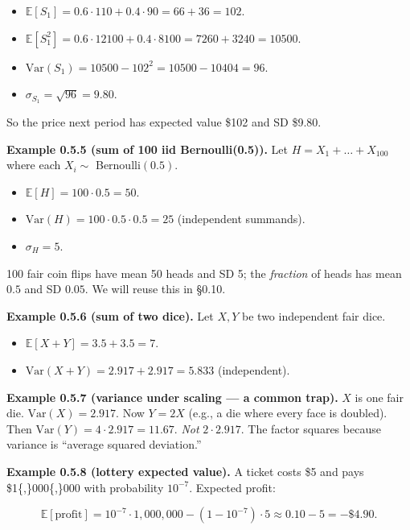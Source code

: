 \documentclass[
  10pt,
  twoside]{book}
\providecommand{\tightlist}{%
  \setlength{\itemsep}{0pt}\setlength{\parskip}{0pt}}
\begin{document}
\begin{itemize}
\tightlist
\item
  \(\mathbb{E}[S_1] = 0.6 \cdot 110 + 0.4 \cdot 90 = 66 + 36 = 102\).
\item
  \(\mathbb{E}[S_1^2] = 0.6 \cdot 12100 + 0.4 \cdot 8100 = 7260 + 3240 = 10500\).
\item
  \(\mathrm{Var}(S_1) = 10500 - 102^2 = 10500 - 10404 = 96\).
\item
  \(\sigma_{S_1} = \sqrt{96} = 9.80\).
\end{itemize}

So the price next period has expected value \$102 and SD \$9.80.

\textbf{Example 0.5.5 (sum of 100 iid Bernoulli(0.5)).} Let
\(H = X_1 + \dots + X_{100}\) where each \(X_i \sim\)
Bernoulli\((0.5)\).

\begin{itemize}
\tightlist
\item
  \(\mathbb{E}[H] = 100 \cdot 0.5 = 50\).
\item
  \(\mathrm{Var}(H) = 100 \cdot 0.5 \cdot 0.5 = 25\) (independent
  summands).
\item
  \(\sigma_H = 5\).
\end{itemize}

100 fair coin flips have mean 50 heads and SD 5; the \emph{fraction} of
heads has mean \(0.5\) and SD \(0.05\). We will reuse this in §0.10.

\textbf{Example 0.5.6 (sum of two dice).} Let \(X, Y\) be two
independent fair dice.

\begin{itemize}
\tightlist
\item
  \(\mathbb{E}[X + Y] = 3.5 + 3.5 = 7\).
\item
  \(\mathrm{Var}(X + Y) = 2.917 + 2.917 = 5.833\) (independent).
\end{itemize}

\textbf{Example 0.5.7 (variance under scaling --- a common trap).} \(X\)
is one fair die. \(\mathrm{Var}(X) = 2.917\). Now \(Y = 2X\) (e.g., a
die where every face is doubled). Then
\(\mathrm{Var}(Y) = 4 \cdot 2.917 = 11.67\). \emph{Not}
\(2 \cdot 2.917\). The factor squares because variance is ``average
squared deviation.''

\textbf{Example 0.5.8 (lottery expected value).} A ticket costs \$5 and
pays \$1\{,\}000\{,\}000 with probability \(10^{-7}\). Expected profit:

\[\mathbb{E}[\text{profit}] = 10^{-7} \cdot 1{,}000{,}000 - (1 - 10^{-7}) \cdot 5 \approx 0.10 - 5 = -\$4.90.\]
\end{document}
